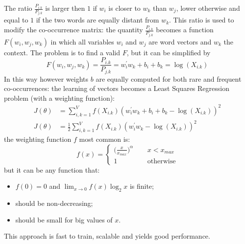 \documentclass[11pt, a4page]{article}
\begin{document}
The ratio $\frac{P_{i.k}}{P_{j.k}}$ is larger then $1$ if $w_i$ is closer to $w_k$ than $w_j$, lower otherwise and equal to $1$ if the two words are equally distant from $w_k$.
This ratio is used to modify the co-occurrence matrix: the quantity $\frac{P_{i.k}}{P_{j.k}}$ becomes a function $F(w_i, w_j, w_k)$ in which all variables $w_i$ and $w_j$ are word vectors and $w_k$ the context.
The problem is to find a valid $F$, but it can be simplified by
\begin{equation*}
  F(w_i, w_j, w_k) = \frac{P_{i.k}}{P_{j.k}} = w_i^\prime w_k + b_i + b_k = \log(X_{i.k})
\end{equation*}
In this way however weights $b$ are equally computed for both rare and frequent co-occurrences: the learning of vectors becomes a Least Squares Regression problem (with a weighting function):
\begin{align*}
  J(\theta) &= \sum_{i, k = 1}^V f(X_{i.k})(w_i^\prime w_k + b_i + b_k - \log(X_{i.k}))^2 \\
  J(\theta) &= \frac{1}{2} \sum_{i, k = 1}^V f(X_{i.k})(w_i^\prime w_k - \log(X_{i.k}))^2
\end{align*}
the weighting function $f$ most common is:
\begin{equation*}
  f(x) = \begin{cases}
    \big( \frac{x}{x_{max}}\big)^\alpha \hspace{15pt}& x < x_{max} \\
    1 & \text{otherwise}
    \end{cases}
\end{equation*}
but it can be any function that:
\begin{itemize}[noitemsep]
\item $f(0) = 0$ and $\lim_{x \to 0}f(x) \log_2 x$ is finite;
\item should be non-decreasing;
\item should be small for big values of $x$.
\end{itemize}
This approach is fast to train, scalable and yields good performance.
\end{document}
